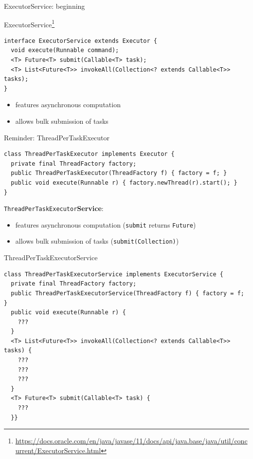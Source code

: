 \begin{frame}[fragile]{ExecutorService: beginning}

ExecutorService\footnote{\tiny\url{https://docs.oracle.com/en/java/javase/11/docs/api/java.base/java/util/concurrent/ExecutorService.html}}

\begin{verbatim}
interface ExecutorService extends Executor {
  void execute(Runnable command);
  <T> Future<T> submit(Callable<T> task);
  <T> List<Future<T>> invokeAll(Collection<? extends Callable<T>> tasks);
}
\end{verbatim}

\begin{itemize}
    \item features asynchronous computation
    \item allows bulk submission of tasks
\end{itemize}

\end{frame}


\begin{frame}[t,fragile]{Reminder: ThreadPerTaskExecutor}

\begin{verbatim}
class ThreadPerTaskExecutor implements Executor {
  private final ThreadFactory factory;
  public ThreadPerTaskExecutor(ThreadFactory f) { factory = f; }
  public void execute(Runnable r) { factory.newThread(r).start(); }
}
\end{verbatim}

\pause
\texttt{ThreadPerTaskExecutor}\textbf{Service}:
\begin{itemize}
    \item features asynchronous computation (\texttt{submit} returns \texttt{Future})
    \item allows bulk submission of tasks (\texttt{submit(Collection)})
\end{itemize}

\end{frame}

\begin{frame}{ThreadPerTaskExecutorService}

\begin{verbatim}
class ThreadPerTaskExecutorService implements ExecutorService {
  private final ThreadFactory factory;
  public ThreadPerTaskExecutorService(ThreadFactory f) { factory = f; }
  public void execute(Runnable r) { 
    ???
  }
  <T> List<Future<T>> invokeAll(Collection<? extends Callable<T>> tasks) {
    ???
    ???
    ???
  }
  <T> Future<T> submit(Callable<T> task) {
    ???
  }}
\end{verbatim}
\end{frame}


